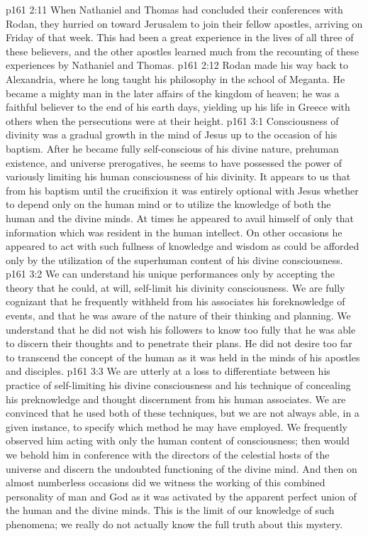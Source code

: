 \pc \vs p161 2:11 When Nathaniel and Thomas had concluded their conferences with Rodan, they hurried on toward Jerusalem to join their fellow apostles, arriving on Friday of that week. This had been a great experience in the lives of all three of these believers, and the other apostles learned much from the recounting of these experiences by Nathaniel and Thomas.
\vs p161 2:12 Rodan made his way back to Alexandria, where he long taught his philosophy in the school of Meganta. He became a mighty man in the later affairs of the kingdom of heaven; he was a faithful believer to the end of his earth days, yielding up his life in Greece with others when the persecutions were at their height.
\vs p161 3:1 Consciousness of divinity was a gradual growth in the mind of Jesus up to the occasion of his baptism. After he became fully self\hyp{}conscious of his divine nature, prehuman existence, and universe prerogatives, he seems to have possessed the power of variously limiting his human consciousness of his divinity. It appears to us that from his baptism until the crucifixion it was entirely optional with Jesus whether to depend only on the human mind or to utilize the knowledge of both the human and the divine minds. At times he appeared to avail himself of only that information which was resident in the human intellect. On other occasions he appeared to act with such fullness of knowledge and wisdom as could be afforded only by the utilization of the superhuman content of his divine consciousness.
\vs p161 3:2 We can understand his unique performances only by accepting the theory that he could, at will, self\hyp{}limit his divinity consciousness. We are fully cognizant that he frequently withheld from his associates his foreknowledge of events, and that he was aware of the nature of their thinking and planning. We understand that he did not wish his followers to know too fully that he was able to discern their thoughts and to penetrate their plans. He did not desire too far to transcend the concept of the human as it was held in the minds of his apostles and disciples.
\vs p161 3:3 We are utterly at a loss to differentiate between his practice of self\hyp{}limiting his divine consciousness and his technique of concealing his preknowledge and thought discernment from his human associates. We are convinced that he used both of these techniques, but we are not always able, in a given instance, to specify which method he may have employed. We frequently observed him acting with only the human content of consciousness; then would we behold him in conference with the directors of the celestial hosts of the universe and discern the undoubted functioning of the divine mind. And then on almost numberless occasions did we witness the working of this combined personality of man and God as it was activated by the apparent perfect union of the human and the divine minds. This is the limit of our knowledge of such phenomena; we really do not actually know the full truth about this mystery.
